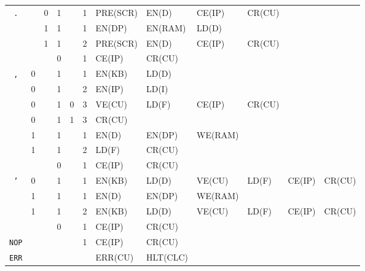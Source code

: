 \begin{landscape}
\begin{longtable}[c] {c|cccc|c|llllll}
    \rowcolor{Gray}  \texttt{.}   &   & 0 & 1     &      & 1     & PRE(SCR) & EN(D)    & CE(IP)  & CR(CU) &        &        \\
    \rowcolor{White}              &   & 1 & 1     &      & 1     & EN(DP)   & EN(RAM)  & LD(D)   &        &        &        \\
    \rowcolor{White}              &   & 1 & 1     &      & 2     & PRE(SCR) & EN(D)    & CE(IP)  & CR(CU) &        &        \\
    \rowcolor{Gray}               &   &   & 0     &      & 1     & CE(IP)   & CR(CU)   &         &        &        &        \\ \hline
    
    \rowcolor{White} \texttt{,}   & 0 &   & 1     &      & 1     & EN(KB)   & LD(D)    &         &        &        &        \\
    \rowcolor{White}              & 0 &   & 1     &      & 2     & EN(IP)   & LD(I)    &         &        &        &        \\
    \rowcolor{Gray}               & 0 &   & 1     & 0    & 3     & VE(CU)   & LD(F)    & CE(IP)  & CR(CU) &        &        \\
    \rowcolor{White}              & 0 &   & 1     & 1    & 3     & CR(CU)   &          &         &        &        &        \\   
    \rowcolor{Gray}               & 1 &   & 1     &      & 1     & EN(D)    & EN(DP)   & WE(RAM) &        &        &        \\
    \rowcolor{Gray}               & 1 &   & 1     &      & 2     & LD(F)    & CR(CU)   &         &        &        &        \\
    \rowcolor{White}              &   &   & 0     &      & 1     & CE(IP)   & CR(CU)   &         &        &        &        \\ \hline
    
    \rowcolor{Gray}  \texttt{'}   & 0 &   & 1     &      & 1     & EN(KB)   & LD(D)    & VE(CU)  & LD(F)  & CE(IP) & CR(CU) \\
    \rowcolor{White}              & 1 &   & 1     &      & 1     & EN(D)    & EN(DP)   & WE(RAM) &        &        &        \\
    \rowcolor{White}              & 1 &   & 1     &      & 2     & EN(KB)   & LD(D)    & VE(CU)  & LD(F)  & CE(IP) & CR(CU) \\
    \rowcolor{Gray}               &   &   & 0     &      & 1     & CE(IP)   & CR(CU)   &         &        &        &        \\ \hline
    \rowcolor{White} \texttt{NOP} &   &   &       &      & 1     & CE(IP)   & CR(CU)   &         &        &        &        \\ \hline
    \rowcolor{Gray}  \texttt{ERR} &   &   &       &      &       & ERR(CU)  & HLT(CLC) &         &        &        &        \\ \hline


\end{longtable}
\end{landscape}
